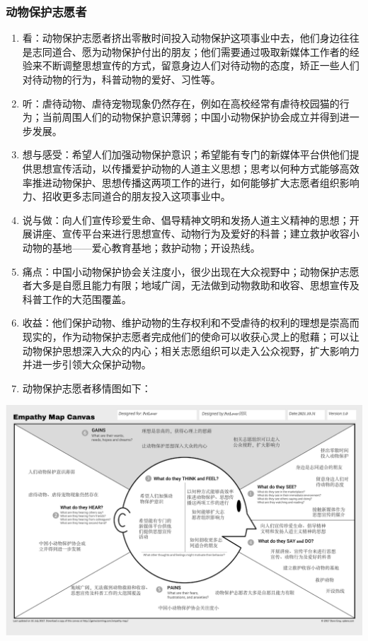 \documentclass[a4paper]{ctexart}
\begin{document}
\subsubsection{动物保护志愿者}
\begin{enumerate}[label=\alph*.]
  \item 看：动物保护志愿者挤出零散时间投入动物保护这项事业中去，他们身边往往是志同道合、愿为动物保护付出的朋友；他们需要通过吸取新媒体工作者的经验来不断调整思想宣传的方式，留意身边人们对待动物的态度，矫正一些人们对待动物的行为，科普动物的爱好、习性等。
  \item 听：虐待动物、虐待宠物现象仍然存在，例如在高校经常有虐待校园猫的行为；当前周围人们的动物保护意识薄弱；中国小动物保护协会成立并得到进一步发展。
  \item 想与感受：希望人们加强动物保护意识；希望能有专门的新媒体平台供他们提供思想宣传活动，以传播爱护动物的人道主义思想；思考以何种方式能够高效率推进动物保护、思想传播这两项工作的进行，如何能够扩大志愿者组织影响力、招收更多志同道合的朋友投入这项事业中。
  \item 说与做：向人们宣传珍爱生命、倡导精神文明和发扬人道主义精神的思想；开展讲座、宣传平台来进行思想宣传、动物行为及爱好的科普；建立救护收容小动物的基地——爱心教育基地；救护动物；开设热线。
  \item 痛点：中国小动物保护协会关注度小，很少出现在大众视野中；动物保护志愿者大多是自愿且能力有限；地域广阔，无法做到动物救助和收容、思想宣传及科普工作的大范围覆盖。
  \item 收益：他们保护动物、维护动物的生存权利和不受虐待的权利的理想是崇高而现实的，作为动物保护志愿者完成他们的使命可以收获心灵上的慰藉；可以让动物保护思想深入大众的内心；相关志愿组织可以走入公众视野，扩大影响力并进一步引领大众保护动物。
  \item 动物保护志愿者移情图如下：
\end{enumerate}
\begin{center}
  \includegraphics[width=16cm]{./移情图/动物保护志愿者}
\end{center}
\end{document}
